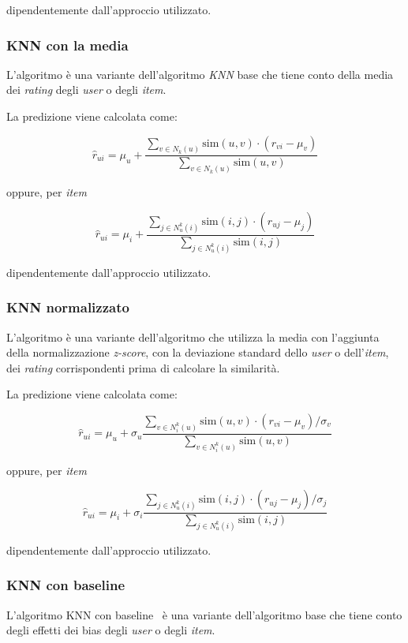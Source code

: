 dipendentemente dall'approccio utilizzato.

\subsubsection{KNN con la media}

L'algoritmo è una variante dell'algoritmo \textit{KNN} base che tiene conto della media dei \textit{rating} degli \textit{user} o degli \textit{item}.

La predizione viene calcolata come:

\[
\hat{r}_{ui} = \mu_u + \frac{\sum\limits_{v \in N_k(u)} \text{sim}(u, v) \cdot (r_{vi} - \mu_v)}{\sum\limits_{v \in N_k(u)} \text{sim}(u, v)}
\]

oppure, per \textit{item}

\[
\hat{r}_{ui} = \mu_i + \frac{\sum\limits_{j \in N^k_u(i)} \text{sim}(i, j) \cdot (r_{uj} - \mu_j)}{\sum\limits_{j \in N^k_u(i)} \text{sim}(i, j)}
\]

dipendentemente dall'approccio utilizzato.

\subsubsection{KNN normalizzato}

L'algoritmo è una variante dell'algoritmo che utilizza la media con l'aggiunta della normalizzazione \textit{z-score}, con la deviazione standard dello \textit{user} o dell'\textit{item}, dei \textit{rating} corrispondenti prima di calcolare la similarità.

La predizione viene calcolata come:

\[
\hat{r}_{ui} = \mu_u + \sigma_u \frac{\sum\limits_{v \in N^k_i(u)} \text{sim}(u, v) \cdot (r_{vi} - \mu_v) / \sigma_v}{\sum\limits_{v \in N^k_i(u)} \text{sim}(u, v)}
\]

oppure, per \textit{item}

\[
\hat{r}_{ui} = \mu_i + \sigma_i \frac{\sum\limits_{j \in N^k_u(i)} \text{sim}(i, j) \cdot (r_{uj} - \mu_j) / \sigma_j}{\sum\limits_{j \in N^k_u(i)} \text{sim}(i, j)}
\]

dipendentemente dall'approccio utilizzato.

\subsubsection{KNN con baseline}\label{knn_baseline}

L'algoritmo KNN con baseline~\cite{KNN_baseline} è una variante dell'algoritmo base che tiene conto degli effetti dei bias degli \textit{user} o degli \textit{item}.

